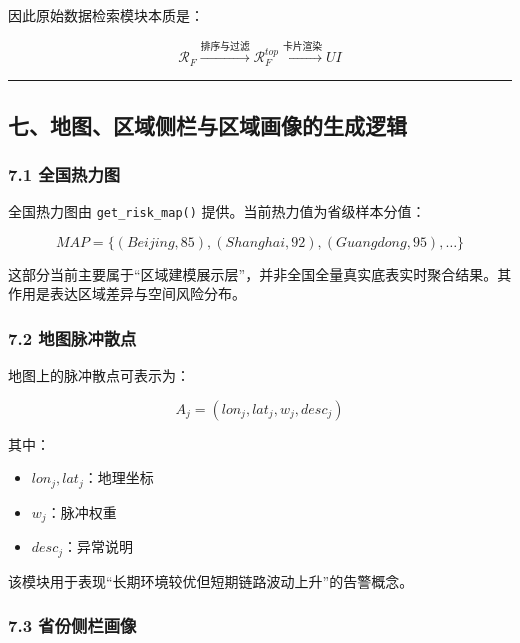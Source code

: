 \documentclass[
]{article}
\providecommand{\tightlist}{%
  \setlength{\itemsep}{0pt}\setlength{\parskip}{0pt}}
\begin{document}
因此原始数据检索模块本质是：

\[
\mathcal{R}_F \xrightarrow{\text{排序与过滤}} \mathcal{R}_F^{top} \xrightarrow{\text{卡片渲染}} UI
\]

\begin{center}\rule{0.5\linewidth}{0.5pt}\end{center}

\subsection{七、地图、区域侧栏与区域画像的生成逻辑}\label{ux4e03ux5730ux56feux533aux57dfux4fa7ux680fux4e0eux533aux57dfux753bux50cfux7684ux751fux6210ux903bux8f91}

\subsubsection{7.1 全国热力图}\label{ux5168ux56fdux70edux529bux56fe}

全国热力图由 \texttt{get\_risk\_map()} 提供。当前热力值为省级样本分值：

\[
MAP = \{(Beijing,85), (Shanghai,92), (Guangdong,95), \dots\}
\]

这部分当前主要属于``区域建模展示层''，并非全国全量真实底表实时聚合结果。其作用是表达区域差异与空间风险分布。

\subsubsection{7.2
地图脉冲散点}\label{ux5730ux56feux8109ux51b2ux6563ux70b9}

地图上的脉冲散点可表示为：

\[
A_j = (lon_j, lat_j, w_j, desc_j)
\]

其中：

\begin{itemize}
\tightlist
\item
  \(lon_j, lat_j\)：地理坐标
\item
  \(w_j\)：脉冲权重
\item
  \(desc_j\)：异常说明
\end{itemize}

该模块用于表现``长期环境较优但短期链路波动上升''的告警概念。

\subsubsection{7.3
省份侧栏画像}\label{ux7701ux4efdux4fa7ux680fux753bux50cf}
\end{document}
